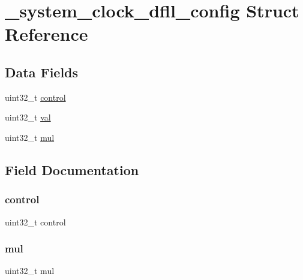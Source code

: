 \hypertarget{struct__system__clock__dfll__config}{}\section{\+\_\+system\+\_\+clock\+\_\+dfll\+\_\+config Struct Reference}
\label{struct__system__clock__dfll__config}
\subsection*{Data Fields}
\begin{DoxyCompactItemize}
\item 
uint32\+\_\+t \mbox{\hyperlink{struct__system__clock__dfll__config_af47d900be5b5e5b1cce48f959401cb4e}{control}}
\item 
uint32\+\_\+t \mbox{\hyperlink{struct__system__clock__dfll__config_a97ad06b300d95ba1d023dcb1e825335f}{val}}
\item 
uint32\+\_\+t \mbox{\hyperlink{struct__system__clock__dfll__config_a4a16a92acc6ffbe4d73f23141826dd02}{mul}}
\end{DoxyCompactItemize}


\subsection{Field Documentation}
\mbox{\label{struct__system__clock__dfll__config_af47d900be5b5e5b1cce48f959401cb4e}} 
\subsubsection{\texorpdfstring{control}{control}}
{\footnotesize\ttfamily uint32\+\_\+t control}

\mbox{\label{struct__system__clock__dfll__config_a4a16a92acc6ffbe4d73f23141826dd02}} 
\subsubsection{\texorpdfstring{mul}{mul}}
{\footnotesize\ttfamily uint32\+\_\+t mul}


